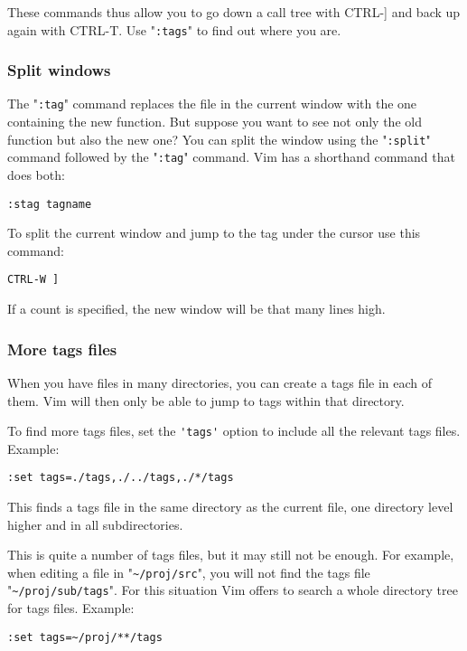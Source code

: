 These commands thus allow you to go down a call tree with CTRL-] and back up again with CTRL-T.
Use "\verb!:tags!" to find out where you are.
\subsubsection{Split windows}
The "\verb!:tag!" command replaces the file in the current window with the one containing the new function.
But suppose you want to see not only the old function but also the new one?  You can split the window using the "\verb!:split!" command followed by the "\verb!:tag!" command.
Vim has a shorthand command that does both:

\begin{Verbatim}[samepage=true]
 :stag tagname
\end{Verbatim}

To split the current window and jump to the tag under the cursor use this command:

\begin{Verbatim}[samepage=true]
 CTRL-W ]
\end{Verbatim}

If a count is specified, the new window will be that many lines high.
\subsubsection{More tags files}
When you have files in many directories, you can create a tags file in each of them.
Vim will then only be able to jump to tags within that directory.

To find more tags files, set the \verb!'tags'! option to include all the relevant tags files.
Example:

\begin{Verbatim}[samepage=true]
 :set tags=./tags,./../tags,./*/tags
\end{Verbatim}

This finds a tags file in the same directory as the current file, one directory level higher and in all subdirectories.

This is quite a number of tags files, but it may still not be enough.
For example, when editing a file in "\verb!~/proj/src!", you will not find the tags file "\verb!~/proj/sub/tags!".
For this situation Vim offers to search a whole directory tree for tags files.
Example:

\begin{Verbatim}[samepage=true]
 :set tags=~/proj/**/tags
\end{Verbatim}
